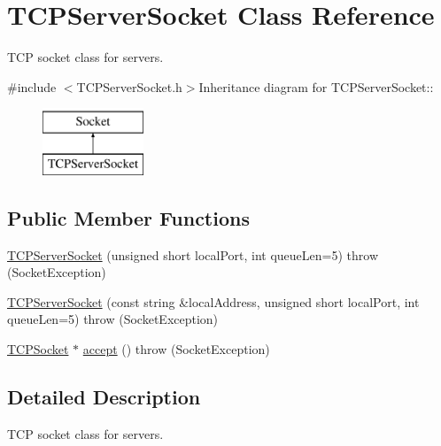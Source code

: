 \hypertarget{classTCPServerSocket}{
\section{TCPServerSocket Class Reference}
\label{classTCPServerSocket}
}


TCP socket class for servers.  


{\ttfamily \#include $<$TCPServerSocket.h$>$}Inheritance diagram for TCPServerSocket::\begin{figure}[H]
\begin{center}
\leavevmode
\includegraphics[height=2cm]{classTCPServerSocket}
\end{center}
\end{figure}
\subsection*{Public Member Functions}
\begin{DoxyCompactItemize}
\item 
\hyperlink{classTCPServerSocket_ae559a3154527d09fe14a8e5ee1f53d7a}{TCPServerSocket} (unsigned short localPort, int queueLen=5)  throw (SocketException)
\item 
\hyperlink{classTCPServerSocket_a3908fecb1b038f7c14fcc7726f54d01d}{TCPServerSocket} (const string \&localAddress, unsigned short localPort, int queueLen=5)  throw (SocketException)
\item 
\hyperlink{classTCPSocket}{TCPSocket} $\ast$ \hyperlink{classTCPServerSocket_a1d161137e1b069de7a7bfc14d3f8212c}{accept} ()  throw (SocketException)
\end{DoxyCompactItemize}


\subsection{Detailed Description}
TCP socket class for servers. 

